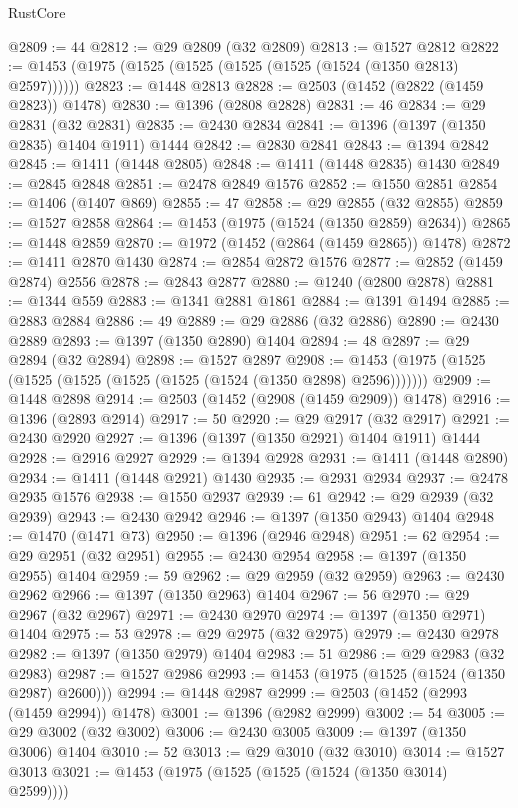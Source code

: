 \begin{lexlean}{RustCore}
\begin{coremodule}
@2809 := 44
@2812 := @29 @2809 (@32 @2809)
@2813 := @1527 @2812
@2822 := @1453 (@1975 (@1525 (@1525 (@1525 (@1525 (@1524 (@1350 @2813) @2597))))))
@2823 := @1448 @2813
@2828 := @2503 (@1452 (@2822 (@1459 @2823)) @1478)
@2830 := @1396 (@2808 @2828)
@2831 := 46
@2834 := @29 @2831 (@32 @2831)
@2835 := @2430 @2834
@2841 := @1396 (@1397 (@1350 @2835) @1404 @1911) @1444
@2842 := @2830 @2841
@2843 := @1394 @2842
@2845 := @1411 (@1448 @2805)
@2848 := @1411 (@1448 @2835) @1430
@2849 := @2845 @2848
@2851 := @2478 @2849 @1576
@2852 := @1550 @2851
@2854 := @1406 (@1407 @869)
@2855 := 47
@2858 := @29 @2855 (@32 @2855)
@2859 := @1527 @2858
@2864 := @1453 (@1975 (@1524 (@1350 @2859) @2634))
@2865 := @1448 @2859
@2870 := @1972 (@1452 (@2864 (@1459 @2865)) @1478)
@2872 := @1411 @2870 @1430
@2874 := @2854 @2872 @1576
@2877 := @2852 (@1459 @2874) @2556
@2878 := @2843 @2877
@2880 := @1240 (@2800 @2878)
@2881 := @1344 @559
@2883 := @1341 @2881 @1861
@2884 := @1391 @1494
@2885 := @2883 @2884
@2886 := 49
@2889 := @29 @2886 (@32 @2886)
@2890 := @2430 @2889
@2893 := @1397 (@1350 @2890) @1404
@2894 := 48
@2897 := @29 @2894 (@32 @2894)
@2898 := @1527 @2897
@2908 := @1453 (@1975 (@1525 (@1525 (@1525 (@1525 (@1525 (@1524 (@1350 @2898) @2596)))))))
@2909 := @1448 @2898
@2914 := @2503 (@1452 (@2908 (@1459 @2909)) @1478)
@2916 := @1396 (@2893 @2914)
@2917 := 50
@2920 := @29 @2917 (@32 @2917)
@2921 := @2430 @2920
@2927 := @1396 (@1397 (@1350 @2921) @1404 @1911) @1444
@2928 := @2916 @2927
@2929 := @1394 @2928
@2931 := @1411 (@1448 @2890)
@2934 := @1411 (@1448 @2921) @1430
@2935 := @2931 @2934
@2937 := @2478 @2935 @1576
@2938 := @1550 @2937
@2939 := 61
@2942 := @29 @2939 (@32 @2939)
@2943 := @2430 @2942
@2946 := @1397 (@1350 @2943) @1404
@2948 := @1470 (@1471 @73)
@2950 := @1396 (@2946 @2948)
@2951 := 62
@2954 := @29 @2951 (@32 @2951)
@2955 := @2430 @2954
@2958 := @1397 (@1350 @2955) @1404
@2959 := 59
@2962 := @29 @2959 (@32 @2959)
@2963 := @2430 @2962
@2966 := @1397 (@1350 @2963) @1404
@2967 := 56
@2970 := @29 @2967 (@32 @2967)
@2971 := @2430 @2970
@2974 := @1397 (@1350 @2971) @1404
@2975 := 53
@2978 := @29 @2975 (@32 @2975)
@2979 := @2430 @2978
@2982 := @1397 (@1350 @2979) @1404
@2983 := 51
@2986 := @29 @2983 (@32 @2983)
@2987 := @1527 @2986
@2993 := @1453 (@1975 (@1525 (@1524 (@1350 @2987) @2600)))
@2994 := @1448 @2987
@2999 := @2503 (@1452 (@2993 (@1459 @2994)) @1478)
@3001 := @1396 (@2982 @2999)
@3002 := 54
@3005 := @29 @3002 (@32 @3002)
@3006 := @2430 @3005
@3009 := @1397 (@1350 @3006) @1404
@3010 := 52
@3013 := @29 @3010 (@32 @3010)
@3014 := @1527 @3013
@3021 := @1453 (@1975 (@1525 (@1525 (@1524 (@1350 @3014) @2599))))

\end{coremodule}
\end{lexlean}
